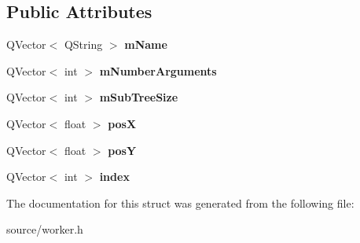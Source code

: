 \subsection*{Public Attributes}
\begin{DoxyCompactItemize}
\item 
\hypertarget{structWorker_1_1TreeStruct_acbf5cc3a0c62e30e99319f99cecf3ff2}{}Q\+Vector$<$ Q\+String $>$ {\bfseries m\+Name}\label{structWorker_1_1TreeStruct_acbf5cc3a0c62e30e99319f99cecf3ff2}

\item 
\hypertarget{structWorker_1_1TreeStruct_a134373fe62f1f9d100cbfade63f21542}{}Q\+Vector$<$ int $>$ {\bfseries m\+Number\+Arguments}\label{structWorker_1_1TreeStruct_a134373fe62f1f9d100cbfade63f21542}

\item 
\hypertarget{structWorker_1_1TreeStruct_a4800a5bcef2bd0805c2d56f5e78abbd0}{}Q\+Vector$<$ int $>$ {\bfseries m\+Sub\+Tree\+Size}\label{structWorker_1_1TreeStruct_a4800a5bcef2bd0805c2d56f5e78abbd0}

\item 
\hypertarget{structWorker_1_1TreeStruct_a4dc36aa9071b30cdeac0284c87081765}{}Q\+Vector$<$ float $>$ {\bfseries pos\+X}\label{structWorker_1_1TreeStruct_a4dc36aa9071b30cdeac0284c87081765}

\item 
\hypertarget{structWorker_1_1TreeStruct_a54a70132834e957ae4cb464fe0dd4a7c}{}Q\+Vector$<$ float $>$ {\bfseries pos\+Y}\label{structWorker_1_1TreeStruct_a54a70132834e957ae4cb464fe0dd4a7c}

\item 
\hypertarget{structWorker_1_1TreeStruct_ae0781ccbd9bb1677381f6bd003df2d0f}{}Q\+Vector$<$ int $>$ {\bfseries index}\label{structWorker_1_1TreeStruct_ae0781ccbd9bb1677381f6bd003df2d0f}

\end{DoxyCompactItemize}


The documentation for this struct was generated from the following file\+:\begin{DoxyCompactItemize}
\item 
source/worker.\+h\end{DoxyCompactItemize}
